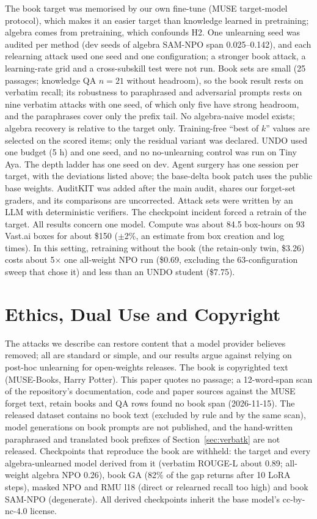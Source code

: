 \documentclass[10pt,twocolumn,letterpaper]{article}
\begin{document}
The book target was memorised by our own fine-tune (MUSE target-model protocol), which makes it an easier target than
knowledge learned in pretraining; algebra comes from pretraining, which confounds H2. One unlearning seed was audited per
method (dev seeds of algebra SAM-NPO span 0.025--0.142), and each relearning attack used one seed and one configuration;
a stronger book attack, a learning-rate grid and a cross-subskill test were not run. Book sets
are small (25 passages; knowledge QA $n=21$ without headroom), so the book result rests on verbatim recall; its
robustness to paraphrased and adversarial prompts rests on nine verbatim attacks with one seed, of which only five have
strong headroom, and the paraphrases cover only the prefix tail.
No algebra-naive model exists; algebra recovery is relative to the target only. Training-free ``best of $k$'' values are
selected on the scored items; only the residual variant was declared. UNDO used one budget (5 h) and one seed, and no
no-unlearning control was run on Tiny Aya. The depth ladder has one seed on dev. Agent surgery has one session per target,
with the deviations listed above; the base-delta book patch uses the public base weights. AuditKIT was added after the
main audit, shares our forget-set graders, and its comparisons are uncorrected. Attack sets were written by an LLM with
deterministic verifiers. The checkpoint incident forced a retrain of the target. All results concern one model. Compute
was about 84.5 box-hours on 93 Vast.ai boxes for about \$150 ($\pm$2\%, an estimate from box creation and log times).
In this setting, retraining without the book (the retain-only twin, \$3.26) costs about 5$\times$ one all-weight NPO run
(\$0.69, excluding the 63-configuration sweep that chose it) and less than an UNDO student (\$7.75).

\section{Ethics, Dual Use and Copyright}

The attacks we describe can restore content that a model provider believes removed; all are standard or simple, and our
results argue against relying on post-hoc unlearning for open-weights releases. The book is copyrighted text (MUSE-Books,
Harry Potter). This paper quotes no passage; a 12-word-span scan of the repository's documentation, code and paper
sources against the MUSE forget text, retain books and QA rows found no book span (2026-11-15). The released dataset contains no book text (excluded by rule and by the same
scan), model generations on book prompts are not published, and the hand-written paraphrased and translated book prefixes
of Section~\ref{sec:verbatk} are not released. Checkpoints that reproduce the book are withheld: the target and every
algebra-unlearned model derived from it (verbatim ROUGE-L about 0.89; all-weight algebra NPO 0.26), book GA (82\% of the
gap returns after 10 LoRA steps), masked NPO and RMU l18 (direct or relearned recall too high) and book SAM-NPO
(degenerate). All derived checkpoints inherit the base model's cc-by-nc-4.0 license.
\end{document}
